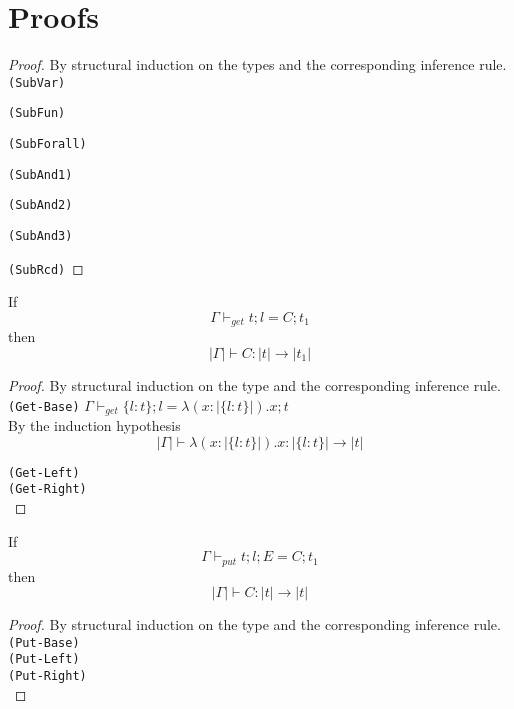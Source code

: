 \section{Proofs}

\begin{proof}
By structural induction on the types and the corresponding inference rule. \\

\texttt{(SubVar)}

\texttt{(SubFun)}

\texttt{(SubForall)}

\texttt{(SubAnd1)}

\texttt{(SubAnd2)}

\texttt{(SubAnd3)}

\texttt{(SubRcd)}

\end{proof}

\begin{lemma}
  If $$ \Gamma \vdash_{get} t ; l = C ; t_1 $$
  then $$ |\Gamma| \vdash C : |t| \to |t_1| $$
\end{lemma}

\begin{proof}
By structural induction on the type and the corresponding inference rule. \\

\texttt{(Get-Base)} $ \Gamma \vdash_{get} \{ l : t \} ; l = \lambda (x : |\{ l : t \}|). x ; t $ \\

By the induction hypothesis
$$ |\Gamma| \vdash \lambda (x : |\{ l : t \}|). x : |\{ l : t \}| \to |t| $$

\texttt{(Get-Left)} \\
\texttt{(Get-Right)} \\

\end{proof}

\begin{lemma}
  If $$ \Gamma \vdash_{put} t ; l ; E = C ; t_1 $$
  then $$ |\Gamma| \vdash C : |t| \to |t| $$
\end{lemma}

\begin{proof}
By structural induction on the type and the corresponding inference rule. \\

\texttt{(Put-Base)} \\
\texttt{(Put-Left)} \\
\texttt{(Put-Right)} \\
\end{proof}

